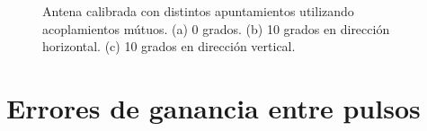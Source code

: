 \begin{figure}[H]
	\centering
 	
		\caption{Antena calibrada con distintos apuntamientos utilizando acoplamientos mútuos. (a) 0 grados. (b) 10 grados en 
		dirección horizontal. (c) 10 grados en dirección vertical.}
	\label{fig:componentErrorsMutual}
\end{figure}


\section{Errores de ganancia entre pulsos}

